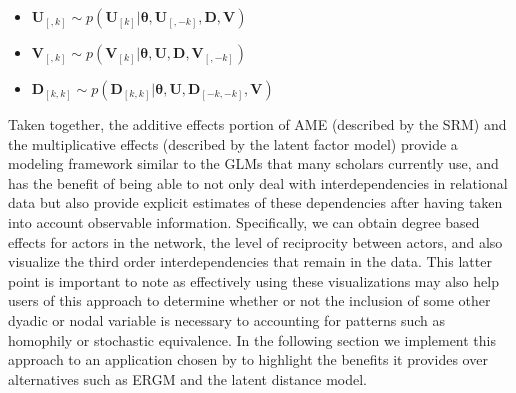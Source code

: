 \begin{itemize}
	\item $\mathbf{U}_{[,k]} \sim p( \mathbf{U}_{[k]} | \bm\theta , \mathbf{U}_{[,-k]}, \mathbf{D}, \mathbf{V} )$
	\item $\mathbf{V}_{[,k]} \sim p( \mathbf{V}_{[k]} | \bm\theta , \mathbf{U}, \mathbf{D}, \mathbf{V}_{[,-k]} )$
	\item $\mathbf{D}_{[k,k]} \sim p( \mathbf{D}_{[k,k]} | \bm\theta , \mathbf{U}, \mathbf{D}_{[-k,-k]}, \mathbf{V} )$
\end{itemize}

Taken together, the additive effects portion of AME (described by the SRM) and the multiplicative effects (described by the latent factor model) provide a modeling framework similar to the GLMs that many scholars currently use, and has the benefit of being able to not only deal with interdependencies in relational data but also provide explicit estimates of these dependencies after having taken into account observable information. Specifically, we can obtain degree based effects for actors in the network, the level of reciprocity between actors, and also visualize the third order interdependencies that remain in the data. This latter point is important to note as effectively using these visualizations may also help users of this approach to determine whether or not the inclusion of some other dyadic or nodal variable is necessary to accounting for patterns such as homophily or stochastic equivalence. In the following section we implement this approach to an application chosen by \citet{cranmer:etal:2016} to highlight the benefits it provides over alternatives such as ERGM and the latent distance model.



